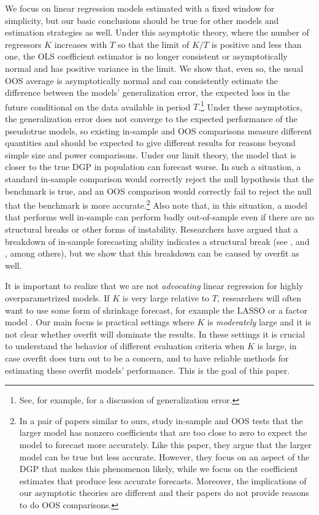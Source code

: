 \documentclass[12pt,draft]{article}
\begin{document}
We focus on linear regression models estimated with a fixed window
for simplicity, but our basic conclusions should be true for other
models and estimation strategies as well.  Under this
asymptotic theory, where the number of regressors $K$ increases with $T$
so that the limit of $K/T$ is positive and less than one,
the OLS coefficient estimator is no longer
consistent or asymptotically normal \citep{Hub:73} and has positive
variance in the limit.  We show that, even so, the usual OOS average
is asymptotically normal and can consistently estimate the difference
between the models' generalization error, the expected loss in the
future conditional on the data available in period
$T$.\footnote{%
  See, for example, \citet{HTF:08} for a discussion of generalization
  error.} %
Under these asymptotics, the generalization
error does not converge to the expected performance of the pseudotrue
models, so existing in-sample and OOS comparisons measure different
quantities and should be expected to give different results for
reasons beyond simple size and power comparisons.  Under our limit theory,
the model that is closer to the true DGP in population can forecast
worse.  In such a situation, a standard in-sample comparison would
correctly reject the null hypothesis that the benchmark is true, and
an OOS comparison would correctly fail to reject the null that the
benchmark is more accurate.\footnote{%
  In a pair of papers similar to ours, \citet{ClM:12,ClM:12b} study
  in-sample and OOS tests that the larger model has nonzero
  coefficients that are too close to zero to expect the model to
  forecast more accurately.  Like this paper, they argue that the
  larger model can be true but less accurate.  However, they focus on
  an aspect of the DGP that makes this phenomenon likely, while we
  focus on the coefficient estimates that produce less accurate
  forecasts.  Moreover, the implications of our asymptotic theories
  are different and their papers do not provide reasons to do OOS
  comparisons.} %
Also note that, in this situation, a model that performs well
in-sample can perform badly out-of-sample even if there are no
structural breaks or other forms of instability.  Researchers
have argued that a breakdown of in-sample forecasting ability
indicates a structural break (see \citealp{BoH:99}, and
\citealp{StW:03}, among others), but we show that this breakdown
can be caused by overfit as well.

It is important to realize that we are not \emph{advocating} linear
regression for highly overparametrized models. If $K$ is very large
relative to $T$, researchers will often want to use some form of
shrinkage forecast, for example the LASSO \citep{Tib:96} or a factor
model \citep{StW:02,BaN:02}. Our main focus is practical settings
where $K$ is \emph{moderately} large and it is not clear whether
overfit will dominate the results. In these settings it is
crucial to understand the behavior of different evaluation criteria
when $K$ is large, in case overfit does turn out to be a concern, and to have reliable
methods for estimating these overfit models' performance. This is the goal of
this paper.
\end{document}
